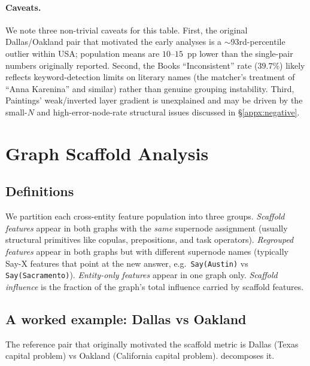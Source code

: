 \paragraph{Caveats.}
We note three non-trivial caveats for this table. First, the original Dallas/Oakland pair that motivated the early analyses is a $\sim$93rd-percentile outlier within USA; population means are $10$--$15$~pp lower than the single-pair numbers originally reported. Second, the Books ``Inconsistent'' rate ($39.7\%$) likely reflects keyword-detection limits on literary names (the matcher's treatment of ``Anna Karenina'' and similar) rather than genuine grouping instability. Third, Paintings' weak/inverted layer gradient is unexplained and may be driven by the small-$N$ and high-error-node-rate structural issues discussed in \S\ref{appx:negative}.

\section{Graph Scaffold Analysis}
\label{appx:scaffold}

\subsection{Definitions}
We partition each cross-entity feature population into three groups. \emph{Scaffold features} appear in both graphs with the \emph{same} supernode assignment (usually structural primitives like copulas, prepositions, and task operators). \emph{Regrouped features} appear in both graphs but with different supernode names (typically Say-X features that point at the new answer, e.g.\ \texttt{Say(Austin)} vs \texttt{Say(Sacramento)}). \emph{Entity-only features} appear in one graph only. \emph{Scaffold influence} is the fraction of the graph's total influence carried by scaffold features.

\subsection{A worked example: Dallas vs Oakland}
The reference pair that originally motivated the scaffold metric is Dallas (Texas capital problem) vs Oakland (California capital problem).  decomposes it.

